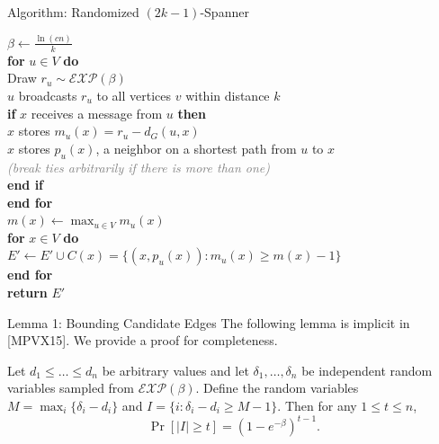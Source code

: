 \documentclass{beamer}
\begin{document}
\begin{frame}{Algorithm: Randomized $(2k-1)$-Spanner}
    \vspace{-0.1cm}
    \begin{block}{}
        \small
        \vspace{0.1cm}
        $\beta \gets \frac{\ln(cn)}{k}$ \\
        \textbf{for} $u \in V$ \textbf{do} \\
        \hspace*{1em} Draw $r_u \sim \mathcal{EXP}(\beta)$ \\
        \hspace*{1em} $u$ broadcasts $r_u$ to all vertices $v$ within distance $k$ \\
        \hspace*{1em} \textbf{if} $x$ receives a message from $u$ \textbf{then} \\
        \hspace*{2em} $x$ stores $m_u(x) = r_u - d_G(u, x)$ \\
        \hspace*{2em} $x$ stores $p_u(x)$, a neighbor on a shortest path from $u$ to $x$ \\
        \hspace*{3em} \textcolor{gray}{\scriptsize \textit{(break ties arbitrarily if there is more than one)}} \\
        \hspace*{1em} \textbf{end if} \\
        \textbf{end for} \\
        $m(x) \gets \max_{u \in V} m_u(x)$ \\
        \textbf{for} $x \in V$ \textbf{do} \\
        \hspace*{1em} $E' \gets E' \cup C(x) = \{ (x, p_u(x)) : m_u(x) \ge m(x) - 1 \}$ \\
        \textbf{end for} \\
        \textbf{return} $E'$
        \vspace{0.1cm}
    \end{block}
\end{frame}

\begin{frame}{Lemma 1: Bounding Candidate Edges}
    The following lemma is implicit in [MPVX15]. We provide a proof for completeness.
    
    \vspace{0.2cm}
    \begin{lemma}[1]
        Let $d_1 \le \dots \le d_n$ be arbitrary values and let $\delta_1, \dots, \delta_n$ be independent random variables sampled from $\mathcal{EXP}(\beta)$. Define the random variables $M = \max_i\{\delta_i - d_i\}$ and $I = \{i : \delta_i - d_i \ge M - 1\}$. Then for any $1 \le t \le n$,
        \[ \Pr[|I| \ge t] = (1 - e^{-\beta})^{t-1} .\]
    \end{lemma}
\end{frame}
\end{document}

